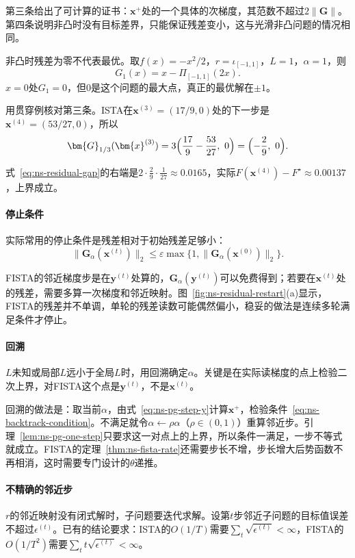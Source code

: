 第三条给出了可计算的证书：$\bm{x}^{+}$处的一个具体的次梯度，其范数不超过$2\lVert\bm{G}\rVert$。第四条说明非凸时没有目标差界，只能保证残差变小，这与光滑非凸问题的情况相同。

非凸时残差为零不代表最优。取$f(x)=-x^2/2$，$r=\iota_{[-1,1]}$，$L=1$，$\alpha=1$，则
\[
 G_1(x)=x-\Pi_{[-1,1]}(2x).
\]
$x=0$处$G_1=0$，但$0$是这个问题的最大点，真正的最优解在$\pm1$。

用贯穿例核对第三条。ISTA在$\bm{x}^{(3)}=(17/9,0)$处的下一步是$\bm{x}^{(4)}=(53/27,0)$，所以
\[
 \bm{G}_{1/3}(\bm{x}^{(3)})=3\Bigl(\frac{17}{9}-\frac{53}{27},\ 0\Bigr)=\Bigl(-\frac29,\ 0\Bigr).
\]

式~\eqref{eq:ns-residual-gap}的右端是$2\cdot\tfrac29\cdot\tfrac{1}{27}\approx0.0165$，实际$F(\bm{x}^{(4)})-F^\star\approx0.00137$，上界成立。

\paragraph{停止条件}
实际常用的停止条件是残差相对于初始残差足够小：
\begin{equation}
 \lVert\bm{G}_\alpha(\bm{x}^{(t)})\rVert_2\leq\varepsilon\max\bigl\{1,\lVert\bm{G}_\alpha(\bm{x}^{(0)})\rVert_2\bigr\}.
 \label{eq:ns-stopping}
\end{equation}

FISTA的邻近梯度步是在$\bm{y}^{(t)}$处算的，$\bm{G}_\alpha(\bm{y}^{(t)})$可以免费得到；若要在$\bm{x}^{(t)}$处的残差，需要多算一次梯度和邻近映射。图~\ref{fig:ns-residual-restart}(a)显示，FISTA的残差并不单调，单轮的残差读数可能偶然偏小，稳妥的做法是连续多轮满足条件才停止。

\paragraph{回溯}
$L$未知或局部$L$远小于全局$L$时，用回溯确定$\alpha$。关键是在实际读梯度的点上检验二次上界，对FISTA这个点是$\bm{y}^{(t)}$，不是$\bm{x}^{(t)}$。

回溯的做法是：取当前$\alpha$，由式~\eqref{eq:ns-pg-step-y}计算$\bm{x}^{+}$，检验条件~\eqref{eq:ns-backtrack-condition}。不满足就令$\alpha\leftarrow\rho\alpha$（$\rho\in(0,1)$）重算邻近步。引理~\ref{lem:ns-pg-one-step}只要求这一对点上的上界，所以条件一满足，一步不等式就成立。FISTA的定理~\ref{thm:ns-fista-rate}还需要步长不增，步长增大后势函数不再相消，这时需要专门设计的$\theta$递推。

\paragraph{不精确的邻近步}
$r$的邻近映射没有闭式解时，子问题要迭代求解。设第$t$步邻近子问题的目标值误差不超过$\epsilon^{(t)}$。已有的结论要求：ISTA的$O(1/T)$需要$\sum_t\sqrt{\epsilon^{(t)}}<\infty$，FISTA的$O(1/T^2)$需要$\sum_tt\sqrt{\epsilon^{(t)}}<\infty$。

